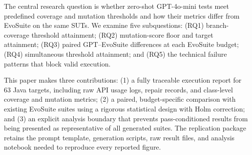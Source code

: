 The central research question is whether zero-shot GPT-4o-mini tests meet predefined coverage and mutation thresholds and how their metrics differ from EvoSuite on the same SUTs. We examine five subquestions: (RQ1) branch-coverage threshold attainment; (RQ2) mutation-score floor and target attainment; (RQ3) paired GPT--EvoSuite differences at each EvoSuite budget; (RQ4) simultaneous threshold attainment; and (RQ5) the technical failure patterns that block valid execution.

This paper makes three contributions: (1) a fully traceable execution report for 63 Java targets, including raw API usage logs, repair records, and class-level coverage and mutation metrics; (2) a paired, budget-specific comparison with existing EvoSuite suites using a rigorous statistical design with Holm correction; and (3) an explicit analysis boundary that prevents pass-conditioned results from being presented as representative of all generated suites. The replication package retains the prompt template, generation scripts, raw result files, and analysis notebook needed to reproduce every reported figure.
